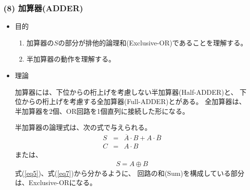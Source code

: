 \documentclass[12pt]{jarticle}
\begin{document}
\subsubsection*{(8) 加算器(ADDER)}
\begin{itemize}
    \item 目的

          \begin{enumerate}
              \item 加算器の$S$の部分が排他的論理和(Exclusive-OR)であることを理解する。
              \item 半加算器の動作を理解する。
          \end{enumerate}

    \item 理論

          加算器には、下位からの桁上げを考慮しない半加算器(Half-ADDER)と、
          下位からの桁上げを考慮する全加算器(Full-ADDER)とがある。
          全加算器は、半加算器を2個、OR回路を1個直列に接続した形になる。

          半加算器の論理式は、次の式で与えられる。
          \begin{eqnarray}
              S &=& \overline{A} \cdot B + A \cdot \overline{B} \label{eq5} \\
              C &=& A \cdot B \label{eq6}
          \end{eqnarray}
          または、
          \begin{eqnarray}
              S = A \oplus B \label{eq7}
          \end{eqnarray}
          式(\ref{eq5})、式(\ref{eq7})から分かるように、
          回路の和(Sum)を構成している部分は、Exclusive-ORになる。


\end{itemize}
\end{document}
